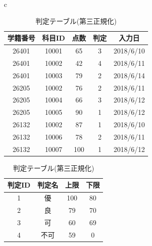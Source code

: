 \documentclass[a4j]{jarticle}
\begin{document}
                \begin{table}[H]
                  \begin{center}
                    \begin{tabular}{c}

                      \begin{minipage}{0.5\hsize}
                  \caption{成績テーブル(第三正規化)}
                  \label{one3G}
                  \begin{center}
                    \begin{tabular}{c|c|c|c|c}\hline
                      学籍番号 & 科目ID & 点数 & 判定 & 入力日 \\ \hline \hline
                      26401 & 10001 & 65 & 3 & 2018/6/10 \\ \hline
                      26401 & 10002 & 42 & 4 & 2018/6/11 \\ \hline
                      26401 & 10003 & 79 & 2 & 2018/6/14 \\ \hline
                      26205 & 10002 & 76 & 2 & 2018/6/11 \\ \hline
                      26205 & 10004 & 66 & 3 & 2018/6/12 \\ \hline
                      26205 & 10005 & 90 & 1 & 2018/6/12 \\ \hline
                      26132 & 10002 & 87 & 1 & 2018/6/10 \\ \hline
                      26132 & 10006 & 78 & 2 & 2018/6/11 \\ \hline
                      26132 & 10007 & 100 & 1 & 2018/6/12 \\ \hline
                    \end{tabular}
                  \end{center}
                \end{minipage}

                \begin{minipage}{0.5\hsize}
                    \caption{判定テーブル(第三正規化)}
                    \label{one3H}
                    \begin{center}
                      \begin{tabular}{c|c|c|c}\hline
                        判定ID & 判定名 & 上限 & 下限 \\ \hline  \hline
                        1 & 優 & 100 & 80 \\ \hline
                        2 & 良 & 79 & 70 \\ \hline
                        3 & 可 & 60 & 69 \\ \hline
                        4 & 不可 & 59 & 0 \\ \hline
                      \end{tabular}
                    \end{center}
                  \end{minipage}
                \end{tabular}
              \end{center}
                    \end{table}
\end{document}
